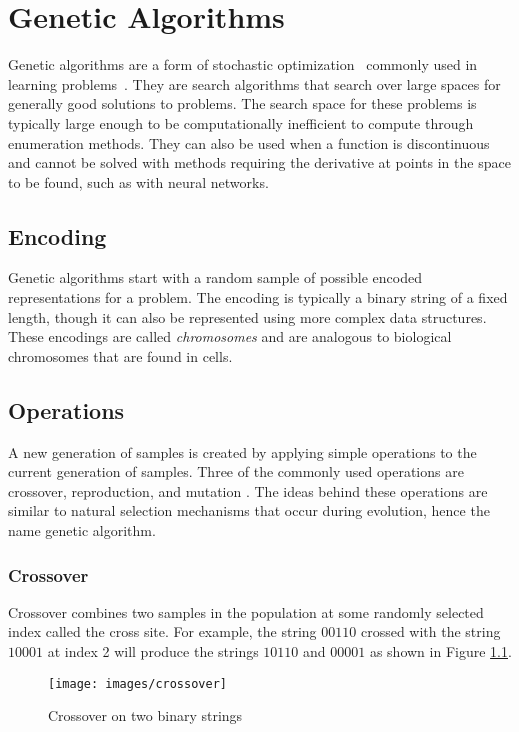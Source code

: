 \chapter[Genetic Algorithms]{Genetic Algorithms}
Genetic algorithms are a form of stochastic optimization~\cite{stochastic} commonly used
in learning problems~\cite{ga1,ga2,ga3}.
They are search algorithms that search over large spaces for generally good solutions to problems.
The search space for these problems is typically large enough to be computationally inefficient to compute through enumeration methods.
They can also be used when a function is discontinuous and cannot be
solved with methods requiring the derivative at points in the
space to be found, such as with neural networks.

\section{Encoding}
Genetic algorithms start with a random sample of possible encoded representations for a problem.
The encoding is typically a binary string of a fixed length, though it can also be represented using more complex data structures.
These encodings are called {\it chromosomes} and are analogous to biological chromosomes that are found in cells.

\section{Operations}
A new generation of samples is created by applying simple operations to the current generation of samples. 
Three of the commonly used operations are crossover, reproduction, and
mutation \cite{goldberg1}.
The ideas behind these operations are similar to natural selection mechanisms that occur during evolution, hence the name genetic algorithm. 

\subsection{Crossover}
Crossover combines two samples in the population at some randomly selected index called the cross site. 
For example, the string $00110$ crossed with the string $10001$ at index 2 will produce the strings $10110$ and $00001$ as shown in Figure \ref{crossover}.

\begin{figure}[h!]
  \centering
  \texttt{[image: images/crossover]}
  \caption{Crossover on two binary strings}
  \label{crossover}
\end{figure}

